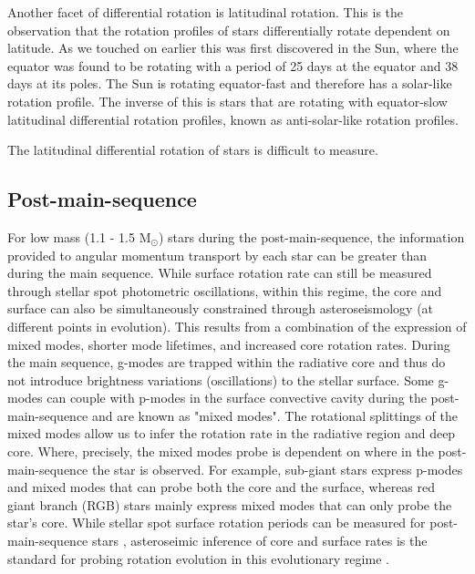 Another facet of differential rotation is latitudinal rotation.
This is the observation that the rotation profiles of stars differentially rotate dependent on latitude.
As we touched on earlier this was first discovered in the Sun, where the equator was found to be rotating with a period of 25 days at the equator and 38 days at its poles.
The Sun is rotating equator-fast and therefore has a solar-like rotation profile.
The inverse of this is stars that are rotating with equator-slow latitudinal differential rotation profiles, known as anti-solar-like rotation profiles.

The latitudinal differential rotation of stars is difficult to measure.



\subsection{Post-main-sequence}

For low mass (1.1 - 1.5 M$_{\odot}$) stars during the post-main-sequence, the information provided to angular momentum transport by each star can be greater than during the main sequence.
While surface rotation rate can still be measured through stellar spot photometric oscillations, within this regime, the core and surface can also be simultaneously constrained through asteroseismology (at different points in evolution). 
This results from a combination of the expression of mixed modes, shorter mode lifetimes, and increased core rotation rates.
During the main sequence, g-modes are trapped within the radiative core and thus do not introduce brightness variations (oscillations) to the stellar surface.
Some g-modes can couple with p-modes in the surface convective cavity during the post-main-sequence and are known as "mixed modes".
The rotational splittings of the mixed modes allow us to infer the rotation rate in the radiative region and deep core. \citep{metcalfe_precise_2010,bedding_gravity_2011}
Where, precisely, the mixed modes probe is dependent on where in the post-main-sequence the star is observed.
For example, sub-giant stars express p-modes and mixed modes that can probe both the core and the surface, whereas red giant branch (RGB) stars mainly express mixed modes that can only probe the star's core.
While stellar spot surface rotation periods can be measured for post-main-sequence stars \citet{mcquillan_rotation_2014, ceillier_surface_2017}, asteroseimic inference of core and surface rates is the standard for probing rotation evolution in this evolutionary regime \citep{deheuvels_seismic_2014, gehan_core_2018, deheuvels_seismic_2020, fellay_asteroseismology_2021}.

